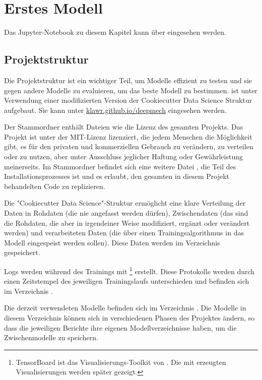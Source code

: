\section{Erstes Modell}

Das Jupyter-Notebook zu diesem Kapitel kann über  eingesehen werden.

\subsection{Projektstruktur}

Die Projektstruktur ist ein wichtiger Teil, um Modelle effizient zu testen und sie gegen andere Modelle zu evaluieren, um das beste Modell zu bestimmen.
 ist unter Verwendung einer modifizierten Version der Cookiecutter Data Science \cite{drivendata2019} Struktur aufgebaut. Sie kann unter \url{klawr.github.io/deepmech} eingesehen werden.

Der Stammordner enthält Dateien wie die Lizenz des gesamten Projekts.
Das Projekt ist unter der MIT-Lizenz lizenziert, die jedem Menschen die Möglichkeit gibt, es für den privaten und kommerziellen Gebrauch zu verändern, zu verteilen oder zu nutzen, aber unter Ausschluss jeglicher Haftung oder Gewährleistung meinerseits.
Im Stammordner befindet sich eine weitere Datei , die Teil des Installationsprozesses ist und es erlaubt, den gesamten in diesem Projekt behandelten Code zu replizieren.

Die "Cookiecutter Data Science"-Struktur ermöglicht eine klare Verteilung der Daten in Rohdaten (die nie angefasst werden dürfen), Zwischendaten (das sind die Rohdaten, die aber in irgendeiner Weise modifiziert, ergänzt oder verändert werden) und verarbeiteten Daten (die über einen Trainingsalgorithmus in das Modell eingespeist werden sollen).
Diese Daten werden im Verzeichnis  gespeichert.

Logs werden während des Trainings mit \footnote{TensorBoard ist das Visualisierungs-Toolkit von . Die mit  erzeugten Visualisierungen werden später gezeigt.} erstellt.
Diese Protokolle werden durch einen Zeitstempel des jeweiligen Trainingslaufs unterschieden und befinden sich im Verzeichnis .

Die derzeit verwendeten Modelle befinden sich im Verzeichnis .
Die Modelle in diesem Verzeichnis können sich in verschiedenen Phasen des Projektes ändern, so dass die jeweiligen Berichte ihre eigenen Modellverzeichnisse haben, um die Zwischenmodelle zu speichern.

